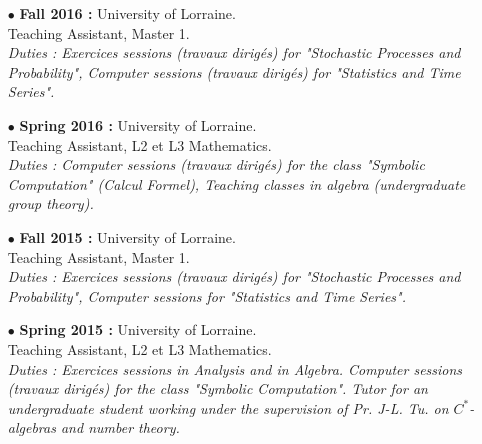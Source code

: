 \documentclass[a4paper]{article}
\begin{document}
\begin{itemize}
\item[$\bullet$] \textbf{ Fall 2016 :} University of Lorraine.\\
					Teaching Assistant, Master 1.\\
					\textit{Duties : Exercices sessions (travaux dirigés) for "Stochastic Processes and Probability", Computer sessions (travaux dirigés) for "Statistics and Time Series".}\\

\item[$\bullet$] \textbf{ Spring 2016 :} University of Lorraine.\\	
					Teaching Assistant, L2 et L3 Mathematics. \\
					\textit{Duties : Computer sessions (travaux dirigés) for the class "Symbolic Computation" (Calcul Formel), Teaching classes in algebra (undergraduate group theory).}\\  
 
\item[$\bullet$] \textbf{ Fall 2015 :} University of Lorraine.\\
					Teaching Assistant, Master 1.\\
					\textit{Duties : Exercices sessions (travaux dirigés) for "Stochastic Processes and Probability", Computer sessions for "Statistics and Time Series".}\\

\item[$\bullet$] \textbf{ Spring 2015 :} University of Lorraine.\\	
					Teaching Assistant, L2 et L3 Mathematics. \\
					\textit{Duties : Exercices sessions in Analysis and in Algebra. Computer sessions (travaux dirigés) for the class "Symbolic Computation". Tutor for an undergraduate student working under the supervision of Pr. J-L. Tu. on $C^*$-algebras and number theory.}\\   
					

\end{itemize}
\end{document}
